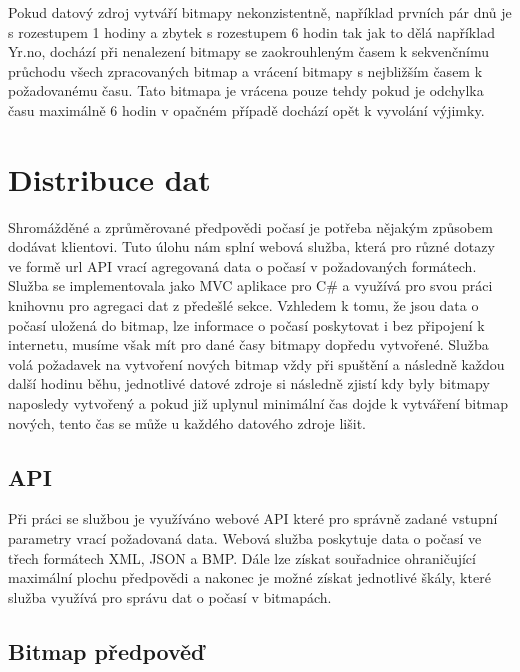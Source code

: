 \documentclass[czech,bachelor,dept460,male,csharp,cpdeclaration]{diploma}
\begin{document}
	Pokud datový zdroj vytváří bitmapy nekonzistentně, například prvních pár dnů je s rozestupem 1 hodiny a zbytek s rozestupem 6 hodin tak jak to dělá například Yr.no, dochází při nenalezení bitmapy se zaokrouhleným časem k sekvenčnímu průchodu všech zpracovaných bitmap a vrácení bitmapy s nejbližším časem k požadovanému času. Tato bitmapa je vrácena pouze tehdy pokud je odchylka času maximálně 6 hodin v opačném případě dochází opět k vyvolání výjimky.
	
	\chapter{Distribuce dat}
	
	Shromážděné a zprůměrované předpovědi počasí je potřeba nějakým způsobem dodávat klientovi. Tuto úlohu nám splní webová služba, která pro různé dotazy ve formě url API vrací agregovaná data o počasí v požadovaných formátech. Služba se implementovala jako MVC aplikace pro C\# a využívá pro svou práci knihovnu pro agregaci dat z předešlé sekce. Vzhledem k tomu, že jsou data o počasí uložená do bitmap, lze informace o počasí poskytovat i bez připojení k internetu, musíme však mít pro dané časy bitmapy dopředu vytvořené. Služba volá požadavek na vytvoření nových bitmap vždy při spuštění a následně každou další hodinu běhu, jednotlivé datové zdroje si následně zjistí kdy byly bitmapy naposledy vytvořený a pokud již uplynul minimální čas dojde k vytváření bitmap nových, tento čas se může u každého datového zdroje lišit.
	
	\section{API}
	
	Při práci se službou je využíváno webové API které pro správně zadané vstupní parametry vrací požadovaná data. Webová služba poskytuje data o počasí ve třech formátech XML, JSON a BMP. Dále lze získat souřadnice ohraničující maximální plochu předpovědi a nakonec je možné získat jednotlivé škály, které služba využívá pro správu dat o počasí v bitmapách.
	
	\section{Bitmap předpověď}
	
\end{document}
